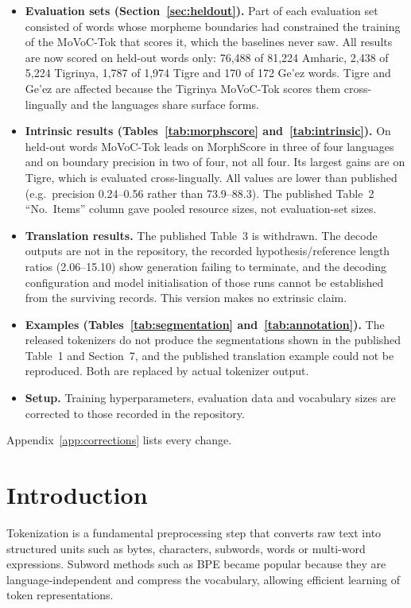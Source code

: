 \documentclass[11pt]{article}
\newcommand{\movoctok}{MoVoC-Tok}
\begin{document}
\begin{itemize}\setlength\itemsep{0pt}
\item \textbf{Evaluation sets (Section~\ref{sec:heldout}).} Part of each
  evaluation set consisted of words whose morpheme boundaries had constrained
  the training of the \movoctok{} that scores it, which the baselines never
  saw. All results are now scored on held-out words only: 76,488 of 81,224
  Amharic, 2,438 of 5,224 Tigrinya, 1,787 of 1,974 Tigre and 170 of 172 Ge'ez
  words. Tigre and Ge'ez are affected because the Tigrinya \movoctok{} scores
  them cross-lingually and the languages share surface forms.
\item \textbf{Intrinsic results (Tables~\ref{tab:morphscore} and~\ref{tab:intrinsic}).}
  On held-out words \movoctok{} leads on MorphScore in three of four languages
  and on boundary precision in two of four, not all four. Its largest gains are
  on Tigre, which is evaluated cross-lingually. All values are lower than
  published (e.g.\ precision 0.24--0.56 rather than 73.9--88.3). The published
  Table~2 ``No.~Items'' column gave pooled resource sizes, not evaluation-set
  sizes.
\item \textbf{Translation results.} The published Table~3 is withdrawn. The
  decode outputs are not in the repository, the recorded hypothesis/reference
  length ratios (2.06--15.10) show generation failing to terminate, and the
  decoding configuration and model initialisation of those runs cannot be
  established from the surviving records. This version makes no extrinsic
  claim.
\item \textbf{Examples (Tables~\ref{tab:segmentation} and~\ref{tab:annotation}).}
  The released tokenizers do not produce the segmentations shown in the
  published Table~1 and Section~7, and the published translation example could
  not be reproduced. Both are replaced by actual tokenizer output.
\item \textbf{Setup.} Training hyperparameters, evaluation data and vocabulary
  sizes are corrected to those recorded in the repository.
\end{itemize}
Appendix~\ref{app:corrections} lists every change.

\section{Introduction}
\label{sec:intro}

Tokenization is a fundamental preprocessing step that converts raw text into
structured units such as bytes, characters, subwords, words or multi-word
expressions. Subword methods such as BPE \citep{sennrich-etal-2016-neural}
became popular because they are language-independent and compress the
vocabulary, allowing efficient learning of token representations.
\end{document}
